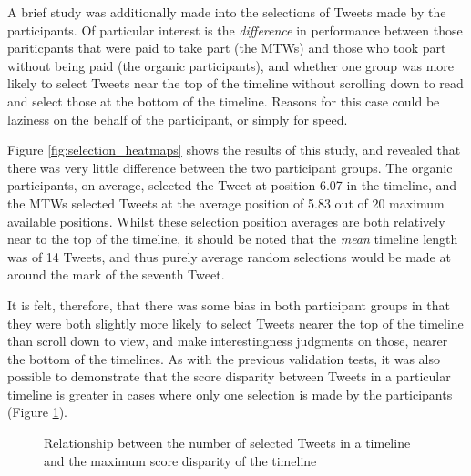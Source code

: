 A brief study was additionally made into the selections of Tweets made by the participants. Of particular interest is the \textit{difference} in performance between those pariticpants that were paid to take part (the MTWs) and those who took part without being paid (the organic participants), and whether one group was more likely to select Tweets near the top of the timeline without scrolling down to read and select those at the bottom of the timeline. Reasons for this case could be laziness on the behalf of the participant, or simply for speed.

Figure \ref{fig:selection_heatmaps} shows the results of this study, and revealed that there was very little difference between the two participant groups. The organic participants, on average, selected the Tweet at position 6.07 in the timeline, and the MTWs selected Tweets at the average position of 5.83 out of 20 maximum available positions. Whilst these selection position averages are both relatively near to the top of the timeline, it should be noted that the \textit{mean} timeline length was of 14 Tweets, and thus purely average random selections would be made at around the mark of the seventh Tweet.

It is felt, therefore, that there was some bias in both participant groups in that they were both slightly more likely to select Tweets nearer the top of the timeline than scroll down to view, and make interestingness judgments on those, nearer the bottom of the timelines. As with the previous validation tests, it was also possible to demonstrate that the score disparity between Tweets in a particular timeline is greater in cases where only one selection is made by the participants (Figure \ref{fig:disparity2}). 

\begin{figure}
    \centering
\caption{Relationship between the number of selected Tweets in a timeline and the maximum score disparity of the timeline}
\label{fig:disparity2}
\end{figure}


